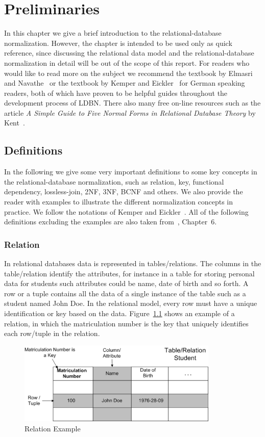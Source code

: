 \chapter{Preliminaries}
\label{chap:preliminaries}
In this chapter we give a brief introduction to the relational-database
normalization. However, the chapter is intended to be used only as quick reference,
since discussing the relational data model and the relational-database normalization
in detail will be out of the scope of this report. For readers who would like to read
more on the subject we recommend the textbook by Elmasri and Navathe~\cite{bdb1} or
the textbook by Kemper and Eickler~\cite{bdb2} for German speaking readers, both of which have 
proven to be helpful guides throughout the development process of LDBN. There also
many free on-line resources such as the article 
\textit{A Simple Guide to Five Normal Forms in Relational Database Theory}
by Kent~\cite{p7}.  

\section{Definitions}
In the following we give some very important definitions to some key
concepts in the relational-database
normalization, such as relation, key, functional dependency, lossless-join, 
2NF, 3NF, BCNF and others. We also provide the reader with examples to illustrate the 
different normalization concepts in practice. We follow the notations 
of Kemper and Eickler~\cite{bdb2}. 
All of the following definitions excluding the examples are also taken from~\cite{bdb2},
Chapter~6.  

\subsection{Relation}
In relational databases data is represented in tables/relations. 
The columns in the table/relation identify the attributes, for instance
in a table for storing personal data for students such attributes could be
name, date of birth and so forth. A row or a tuple contains all the data of a single 
instance of the table such as a student named John Doe.
In the relational model, every row must have a unique identification or 
key based on the data. Figure~\ref{fig:rmodel} shows an example of a relation, in which 
the matriculation number is the key that uniquely identifies each row/tuple in the relation.

\begin{figure}[h]
  \begin{center}
    \includegraphics[width=0.85\textwidth]{./img/rmodel01.png}
    \caption{Relation Example}
    \label{fig:rmodel}
  \end{center}
\end{figure}

